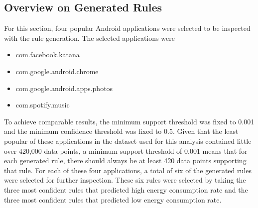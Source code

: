 
\subsection{Overview on Generated Rules}

For this section, four popular Android applications were selected to be inspected with the rule generation. The selected applications were 

\begin{itemize}
	\item com.facebook.katana
	\item com.google.android.chrome
	\item com.google.android.apps.photos
	\item com.spotify.music
\end{itemize}

To achieve comparable results, the minimum support threshold was fixed to 0.001 and the minimum confidence threshold was fixed to 0.5. Given that the least popular of these applications in the dataset used for this analysis contained little over 420,000 data points, a minimum support threshold of 0.001 means that for each generated rule, there should always be at least 420 data points supporting that rule. For each of these four applications, a total of six of the generated rules were selected for further inspection. These six rules were selected by taking the three most confident rules that predicted high energy consumption rate and the three most confident rules that predicted low energy consumption rate.  

